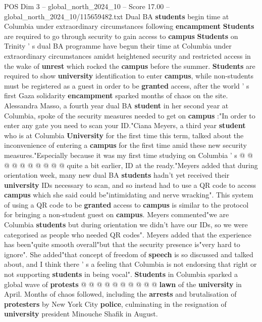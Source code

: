 \begin{textsample}{POS Dim 3 – global\_north\_2024\_10 – Score 17.00 – global\_north\_2024\_10/115659482.txt}  \label{ex:f3_pos_154}
Dual BA \textbf{students} begin time at Columbia under extraordinary circumstances following \textbf{encampment} \textbf{Students} are required to go through security to gain access to \textbf{campus} \textbf{Students} on Trinity ' s dual BA programme have begun their time at Columbia under extraordinary circumstances amidst heightened security and restricted access in the wake of \textbf{unrest} which rocked the \textbf{campus} before the summer. \textbf{Students} are required to show \textbf{university} identification to enter \textbf{campus}, while non-students must be registered as a guest in order to be \textbf{granted} access, after the world ' s first Gaza solidarity \textbf{encampment} sparked months of chaos on the site.
Alessandra Masso, a fourth year dual BA \textbf{student} in her second year at Columbia, spoke of the security measures needed to get on \textbf{campus} :"In order to enter any gate you need to scan your ID."Ciana Meyers, a third year \textbf{student} who is at Columbia \textbf{University} for the first time this term, talked about the inconvenience of entering a \textbf{campus} for the first time amid these new security measures."Especially because it was my first time studying on Columbia ' s @ @ @ @ @ @ @ @ @ @ quite a bit earlier, ID at the ready."Meyers added that during orientation week, many new dual BA \textbf{students} hadn't yet received their \textbf{university} IDs necessary to scan, and so instead had to use a QR code to access \textbf{campus} which she said could be"intimidating and nerve wracking".
This system of using a QR code to be \textbf{granted} access to \textbf{campus} is similar to the protocol for bringing a non-student guest on \textbf{campus}.
Meyers commented"we are Columbia \textbf{students} but during orientation we didn't have our IDs, so we were categorised as people who needed QR codes".
Meyers added that the experience has been"quite smooth overall"but that the security presence is"very hard to ignore".
She added"that concept of freedom of \textbf{speech} is so discussed and talked about, and I think there ' s a feeling that Columbia is not endorsing that right or not supporting \textbf{students} in being vocal". \textbf{Students} in Columbia sparked a global wave of \textbf{protests} @ @ @ @ @ @ @ @ @ @ \textbf{lawn} of the \textbf{university} in April.
Months of chaos followed, including the \textbf{arrests} and brutalisation of \textbf{protesters} by New York City \textbf{police}, culminating in the resignation of \textbf{university} president Minouche Shafik in August.

\end{textsample}
